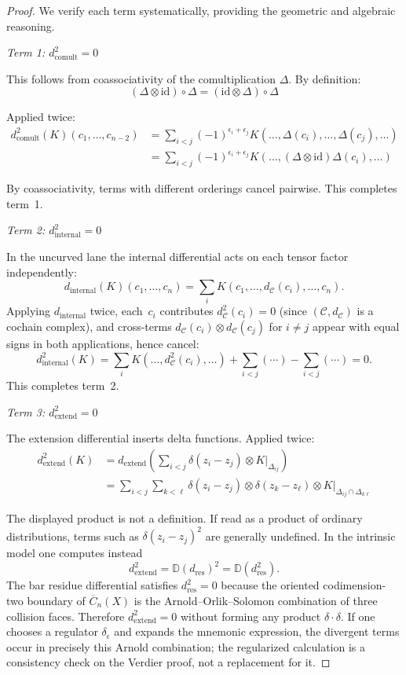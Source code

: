 \begin{proof}
We verify each term systematically, providing the geometric and algebraic reasoning.

\emph{Term 1: $d_{\text{comult}}^2 = 0$}

This follows from coassociativity of the comultiplication $\Delta$. By definition:
\[(\Delta \otimes \text{id}) \circ \Delta = (\text{id} \otimes \Delta) \circ \Delta\]

Applied twice:
\begin{align*}
d_{\text{comult}}^2(K)(c_1, \ldots, c_{n-2}) &= \sum_{i < j} (-1)^{\epsilon_i +
\epsilon_j} K(\ldots, \Delta(c_i), \ldots, \Delta(c_j), \ldots) \\
&= \sum_{i < j} (-1)^{\epsilon_i + \epsilon_j} K(\ldots, (\Delta \otimes \text{id})
\Delta(c_i), \ldots)
\end{align*}

By coassociativity, terms with different orderings cancel pairwise. This completes term~1.

\emph{Term 2: $d_{\text{internal}}^2 = 0$}

In the uncurved lane the internal differential acts on each tensor
factor independently:
\[
d_{\text{internal}}(K)(c_1, \ldots, c_n) = \sum_i K(c_1, \ldots, d_{\mathcal{C}}(c_i), \ldots, c_n).
\]
Applying $d_{\text{internal}}$ twice, each~$c_i$ contributes
$d_{\mathcal{C}}^2(c_i) = 0$ (since $(\mathcal{C}, d_{\mathcal{C}})$
is a cochain complex), and cross-terms
$d_{\mathcal{C}}(c_i) \otimes d_{\mathcal{C}}(c_j)$ for $i \neq j$
appear with equal signs in both applications, hence cancel:
\[d_{\text{internal}}^2(K) = \sum_i K(\ldots, d_{\mathcal{C}}^2(c_i), \ldots) + \sum_{i < j}(\cdots) - \sum_{i < j}(\cdots) = 0.\]
This completes term~2.

\emph{Term 3: $d_{\text{extend}}^2 = 0$}

The extension differential inserts delta functions. Applied twice:
\begin{align*}
d_{\text{extend}}^2(K) &= d_{\text{extend}}\left(\sum_{i<j} \delta(z_i - z_j) \otimes
K|_{\Delta_{ij}}\right) \\
&= \sum_{i<j} \sum_{k<\ell} \delta(z_i - z_j) \otimes \delta(z_k - z_\ell) \otimes
K|_{\Delta_{ij} \cap \Delta_{k\ell}}
\end{align*}

The displayed product is not a definition. If read as a product of
ordinary distributions, terms such as $\delta(z_i-z_j)^2$ are generally
undefined. In the intrinsic model one computes instead
\[
d_{\mathrm{extend}}^2
=\mathbb{D}(d_{\mathrm{res}})^2
=\mathbb{D}(d_{\mathrm{res}}^2).
\]
The bar residue differential satisfies $d_{\mathrm{res}}^2=0$ because
the oriented codimension-two boundary of
\(\overline{C}_n(X)\) is the Arnold--Orlik--Solomon combination of
three collision faces. Therefore
$d_{\mathrm{extend}}^2=0$ without forming any product
$\delta\cdot\delta$. If one chooses a regulator
$\delta_\epsilon$ and expands the mnemonic expression, the divergent
terms occur in precisely this Arnold combination; the regularized
calculation is a consistency check on the Verdier proof, not a
replacement for it.


\end{proof}
